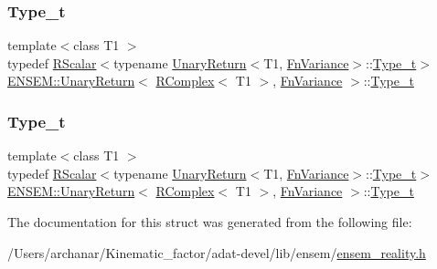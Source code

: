 \subsubsection{\texorpdfstring{Type\_t}{Type\_t}\hspace{0.1cm}{\footnotesize\ttfamily [2/3]}}
{\footnotesize\ttfamily template$<$class T1 $>$ \\
typedef \mbox{\hyperlink{classENSEM_1_1RScalar}{R\+Scalar}}$<$typename \mbox{\hyperlink{structENSEM_1_1UnaryReturn}{Unary\+Return}}$<$T1, \mbox{\hyperlink{structENSEM_1_1FnVariance}{Fn\+Variance}}$>$\+::\mbox{\hyperlink{structENSEM_1_1UnaryReturn_3_01RComplex_3_01T1_01_4_00_01FnVariance_01_4_a85d25582f2c509cb70b5b53ff50ee7ce}{Type\+\_\+t}}$>$ \mbox{\hyperlink{structENSEM_1_1UnaryReturn}{E\+N\+S\+E\+M\+::\+Unary\+Return}}$<$ \mbox{\hyperlink{classENSEM_1_1RComplex}{R\+Complex}}$<$ T1 $>$, \mbox{\hyperlink{structENSEM_1_1FnVariance}{Fn\+Variance}} $>$\+::\mbox{\hyperlink{structENSEM_1_1UnaryReturn_3_01RComplex_3_01T1_01_4_00_01FnVariance_01_4_a85d25582f2c509cb70b5b53ff50ee7ce}{Type\+\_\+t}}}

\mbox{\label{structENSEM_1_1UnaryReturn_3_01RComplex_3_01T1_01_4_00_01FnVariance_01_4_a85d25582f2c509cb70b5b53ff50ee7ce}} 
\subsubsection{\texorpdfstring{Type\_t}{Type\_t}\hspace{0.1cm}{\footnotesize\ttfamily [3/3]}}
{\footnotesize\ttfamily template$<$class T1 $>$ \\
typedef \mbox{\hyperlink{classENSEM_1_1RScalar}{R\+Scalar}}$<$typename \mbox{\hyperlink{structENSEM_1_1UnaryReturn}{Unary\+Return}}$<$T1, \mbox{\hyperlink{structENSEM_1_1FnVariance}{Fn\+Variance}}$>$\+::\mbox{\hyperlink{structENSEM_1_1UnaryReturn_3_01RComplex_3_01T1_01_4_00_01FnVariance_01_4_a85d25582f2c509cb70b5b53ff50ee7ce}{Type\+\_\+t}}$>$ \mbox{\hyperlink{structENSEM_1_1UnaryReturn}{E\+N\+S\+E\+M\+::\+Unary\+Return}}$<$ \mbox{\hyperlink{classENSEM_1_1RComplex}{R\+Complex}}$<$ T1 $>$, \mbox{\hyperlink{structENSEM_1_1FnVariance}{Fn\+Variance}} $>$\+::\mbox{\hyperlink{structENSEM_1_1UnaryReturn_3_01RComplex_3_01T1_01_4_00_01FnVariance_01_4_a85d25582f2c509cb70b5b53ff50ee7ce}{Type\+\_\+t}}}



The documentation for this struct was generated from the following file\+:\begin{DoxyCompactItemize}
\item 
/\+Users/archanar/\+Kinematic\+\_\+factor/adat-\/devel/lib/ensem/\mbox{\hyperlink{adat-devel_2lib_2ensem_2ensem__reality_8h}{ensem\+\_\+reality.\+h}}\end{DoxyCompactItemize}
